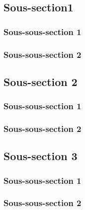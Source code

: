 
\subsection{Sous-section1}
    \subsubsection{Sous-sous-section 1}


    \subsubsection{Sous-sous-section 2}

    
    \subsection{Sous-section 2}
        \subsubsection{Sous-sous-section 1}


        \subsubsection{Sous-sous-section 2}


    \subsection{Sous-section 3}
        \subsubsection{Sous-sous-section 1}


        \subsubsection{Sous-sous-section 2}

